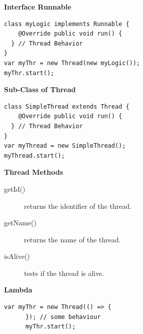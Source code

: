 \begin{minipage}[t]{0.5\linewidth}
\textbf{Interface Runnable}
\begin{lstlisting}[style=java]
class myLogic implements Runnable {
	@Override public void run() {
  }	// Thread Behavior
}
var myThr = new Thread(new myLogic());
myThr.start();
\end{lstlisting}
\end{minipage}
\begin{minipage}[t]{0.5\linewidth}
\textbf{Sub-Class of Thread}
\begin{lstlisting}[style=java]
class SimpleThread extends Thread {
	@Override public void run() {
  }	// Thread Behavior
}
var myThread = new SimpleThread();
myThread.start();
\end{lstlisting}
\end{minipage}

\begin{minipage}[t]{0.5\linewidth}
\textbf{Thread Methods}
\begin{description}
  \item[getId()] returns the identifier of the thread.
  \item[getName()] returns the name of the thread.
  \item[isAlive()] tests if the thread is alive.
\end{description}
\end{minipage}
\begin{minipage}[t]{0.5\linewidth}
  \textbf{Lambda}
  \begin{lstlisting}[style=java]
    var myThr = new Thread(() => { 
      }); // some behaviour
      myThr.start();
    \end{lstlisting}
  \end{minipage}
  \vspace{-1mm}
  
